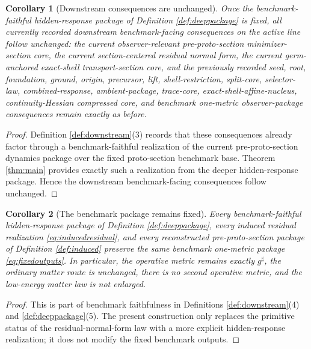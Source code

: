 \documentclass[11pt]{article}
\newcommand{\CompletedMetric}{g^{\sharp}}
\newtheorem{corollary}{Corollary}
\begin{document}
\begin{corollary}[Downstream consequences are unchanged]
\label{cor:downstream}
Once the benchmark-faithful hidden-response package of Definition \ref{def:deeppackage} is fixed, all currently recorded downstream benchmark-facing consequences on the active line follow unchanged: the current observer-relevant pre-proto-section minimizer-section core, the current section-centered residual normal form, the current germ-anchored exact-shell transport-section core, and the previously recorded seed, root, foundation, ground, origin, precursor, lift, shell-restriction, split-core, selector-law, combined-response, ambient-package, trace-core, exact-shell-affine-nucleus, continuity-Hessian compressed core, and benchmark one-metric observer-package consequences remain exactly as before.
\end{corollary}

\begin{proof}
Definition \ref{def:downstream}(3) records that these consequences already factor through a benchmark-faithful realization of the current pre-proto-section dynamics package over the fixed proto-section benchmark base. Theorem \ref{thm:main} provides exactly such a realization from the deeper hidden-response package. Hence the downstream benchmark-facing consequences follow unchanged.
\end{proof}

\begin{corollary}[The benchmark package remains fixed]
\label{cor:benchmark}
Every benchmark-faithful hidden-response package of Definition \ref{def:deeppackage}, every induced residual realization \eqref{eq:inducedresidual}, and every reconstructed pre-proto-section package of Definition \ref{def:induced} preserve the same benchmark one-metric package \eqref{eq:fixedoutputs}. In particular, the operative metric remains exactly \(\CompletedMetric\), the ordinary matter route is unchanged, there is no second operative metric, and the low-energy matter law is not enlarged.
\end{corollary}

\begin{proof}
This is part of benchmark faithfulness in Definitions \ref{def:downstream}(4) and \ref{def:deeppackage}(5). The present construction only replaces the primitive status of the residual-normal-form law with a more explicit hidden-response realization; it does not modify the fixed benchmark outputs.
\end{proof}
\end{document}
